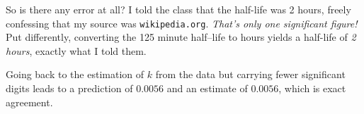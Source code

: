 
So is there any error at all?  I told the class that the half-life was 2 hours,
freely confessing that my source was {\tt wikipedia.org}.  {\sl That's only one significant figure!\/}
Put differently, converting the 125 minute half--life to hours yields
a half-life of {\sl 2 hours\/}, exactly what I told them.


Going back to the estimation of $k$ from the data but carrying fewer significant digits
leads to a prediction of $0.0056$ and an estimate of $0.0056$, 
which is exact agreement.



\bye
